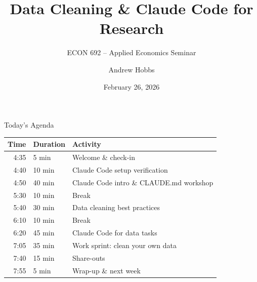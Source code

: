 

\title{Data Cleaning \& Claude Code for Research}
\subtitle{ECON 692 -- Applied Economics Seminar}
\author{Andrew Hobbs}
\date{February 26, 2026}



\begin{frame}[plain]
  \titlepage
\end{frame}


\begin{frame}{Today's Agenda}
  \begin{tabular}{@{}r@{\hspace{8pt}}l@{\hspace{16pt}}l@{}}
    \toprule
    \textbf{Time} & \textbf{Duration} & \textbf{Activity} \\
    \midrule
    4:35 & 5 min  & Welcome \& check-in \\
    4:40 & 10 min & Claude Code setup verification \\
    4:50 & 40 min & Claude Code intro \& CLAUDE.md workshop \\
    5:30 & 10 min & Break \\
    5:40 & 30 min & Data cleaning best practices \\
    6:10 & 10 min & Break \\
    6:20 & 45 min & Claude Code for data tasks \\
    7:05 & 35 min & Work sprint: clean your own data \\
    7:40 & 15 min & Share-outs \\
    7:55 & 5 min  & Wrap-up \& next week \\
    \bottomrule
  \end{tabular}
\end{frame}

